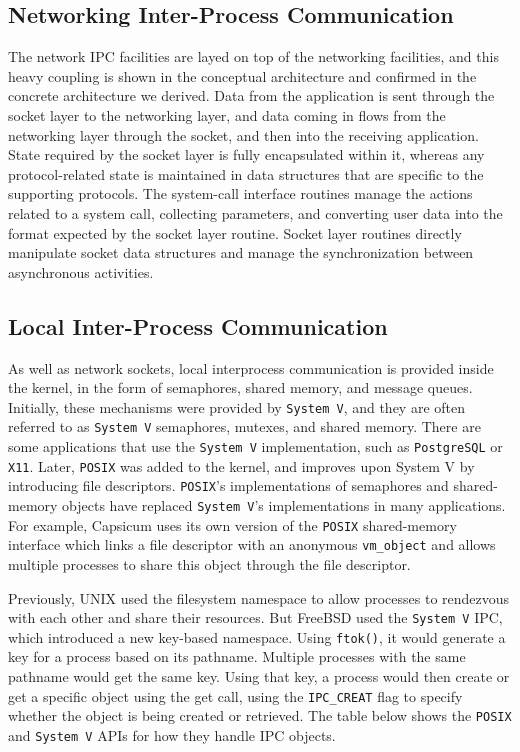 \documentclass[12pt, dvipsnames, a4paper]{article}
\newcommand{\code}[1]{\texttt{#1}}
\begin{document}
\subsection{Networking Inter-Process Communication}
The network IPC facilities are layed on top of the networking facilities, and this heavy coupling is shown in the conceptual architecture and confirmed in the concrete architecture we derived. Data from the application is sent through the socket layer to the networking layer, and data coming in flows from the networking layer through the socket, and then into the receiving application.  State required by the socket layer is fully encapsulated within it, whereas any protocol-related state is maintained in data structures that are specific to the supporting protocols. The system-call interface routines manage the actions related to a system call, collecting parameters, and converting user data into the format expected by the socket layer routine. Socket layer routines directly manipulate socket data structures and manage the synchronization between asynchronous activities.

\subsection{Local Inter-Process Communication}
As well as network sockets, local interprocess communication is provided inside the kernel, in the form of semaphores, shared memory, and message queues. Initially, these mechanisms were provided by \code{System V}, and they are often referred to as \code{System V} semaphores, mutexes, and shared memory. There are some applications that use the \code{System V} implementation, such as \code{PostgreSQL} or \code{X11}. Later, \code{POSIX} was added to the kernel, and improves upon System V by introducing file descriptors. \code{POSIX}’s implementations of semaphores and shared-memory objects have replaced \code{System V}’s implementations in many applications. For example, Capsicum uses its own version of the \code{POSIX} shared-memory interface which links a file descriptor with an anonymous \code{vm\_object} and allows multiple processes to share this object through the file descriptor.

Previously, UNIX used the filesystem namespace to allow processes to rendezvous with each other and share their resources. But FreeBSD used the \code{System V} IPC, which introduced a new key-based namespace. Using \code{ftok()}, it would generate a key for a process based on its pathname. Multiple processes with the same pathname would get the same key. Using that key, a process would then create or get a specific object using the get call, using the \code{IPC\_CREAT} flag to specify whether the object is being created or retrieved. The table below shows the \code{POSIX} and \code{System V} APIs for how they handle IPC objects.
\end{document}
